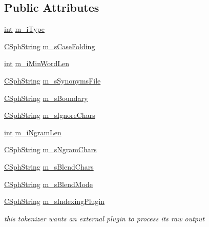 \subsection*{Public Attributes}
\begin{DoxyCompactItemize}
\item 
\hyperlink{sphinxexpr_8cpp_a4a26e8f9cb8b736e0c4cbf4d16de985e}{int} \hyperlink{structCSphTokenizerSettings_a3c09c2768f5fcb422195cd6944a2abd7}{m\-\_\-i\-Type}
\item 
\hyperlink{structCSphString}{C\-Sph\-String} \hyperlink{structCSphTokenizerSettings_a5c8c76363e21ecf9f9e60fdae3837e2b}{m\-\_\-s\-Case\-Folding}
\item 
\hyperlink{sphinxexpr_8cpp_a4a26e8f9cb8b736e0c4cbf4d16de985e}{int} \hyperlink{structCSphTokenizerSettings_a75c5cc951470fd1c7617a7514f60c1d6}{m\-\_\-i\-Min\-Word\-Len}
\item 
\hyperlink{structCSphString}{C\-Sph\-String} \hyperlink{structCSphTokenizerSettings_a1b4bf3e68597390f3ae77a7b9dd0a215}{m\-\_\-s\-Synonyms\-File}
\item 
\hyperlink{structCSphString}{C\-Sph\-String} \hyperlink{structCSphTokenizerSettings_a2d284b0766ef39c6f00dd5a011e2c48c}{m\-\_\-s\-Boundary}
\item 
\hyperlink{structCSphString}{C\-Sph\-String} \hyperlink{structCSphTokenizerSettings_a58df5ab25bc9f57706549865ffcee3d6}{m\-\_\-s\-Ignore\-Chars}
\item 
\hyperlink{sphinxexpr_8cpp_a4a26e8f9cb8b736e0c4cbf4d16de985e}{int} \hyperlink{structCSphTokenizerSettings_a203be76510b06109798ecbaa69249dd8}{m\-\_\-i\-Ngram\-Len}
\item 
\hyperlink{structCSphString}{C\-Sph\-String} \hyperlink{structCSphTokenizerSettings_a84c63750d9a9ac4ed84feb70ae0c6567}{m\-\_\-s\-Ngram\-Chars}
\item 
\hyperlink{structCSphString}{C\-Sph\-String} \hyperlink{structCSphTokenizerSettings_a38e07ad97b2f33730c92f4ab6a9ee031}{m\-\_\-s\-Blend\-Chars}
\item 
\hyperlink{structCSphString}{C\-Sph\-String} \hyperlink{structCSphTokenizerSettings_af1f6c10a5d936b0c87b9bfa9a86f1bde}{m\-\_\-s\-Blend\-Mode}
\item 
\hyperlink{structCSphString}{C\-Sph\-String} \hyperlink{structCSphTokenizerSettings_acd1d422d8233b67fd998c25ab55d8d18}{m\-\_\-s\-Indexing\-Plugin}
\begin{DoxyCompactList}\small\item\em this tokenizer wants an external plugin to process its raw output \end{DoxyCompactList}\end{DoxyCompactItemize}


